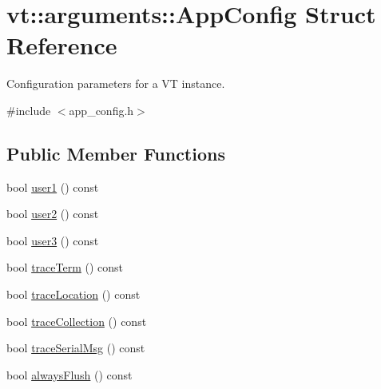 \hypertarget{structvt_1_1arguments_1_1_app_config}{}\section{vt\+:\+:arguments\+:\+:App\+Config Struct Reference}
\label{structvt_1_1arguments_1_1_app_config}


Configuration parameters for a VT instance.  




{\ttfamily \#include $<$app\+\_\+config.\+h$>$}

\subsection*{Public Member Functions}
\begin{DoxyCompactItemize}
\item 
bool \hyperlink{structvt_1_1arguments_1_1_app_config_a2f94b5667c784de4398cb27110555e86}{user1} () const
\item 
bool \hyperlink{structvt_1_1arguments_1_1_app_config_ab504a2952d75b3f1fa9d81e8122cbc41}{user2} () const
\item 
bool \hyperlink{structvt_1_1arguments_1_1_app_config_ad11c798fedeafd2d5ec3f6737226afad}{user3} () const
\item 
bool \hyperlink{structvt_1_1arguments_1_1_app_config_afbe5bc2d7e470809bc204a30158ba96e}{trace\+Term} () const
\item 
bool \hyperlink{structvt_1_1arguments_1_1_app_config_a3a3b55a1c4f5a6b001e346d8b5ce084a}{trace\+Location} () const
\item 
bool \hyperlink{structvt_1_1arguments_1_1_app_config_adddc5276b065e2ea1c7a9b0626a8ce0d}{trace\+Collection} () const
\item 
bool \hyperlink{structvt_1_1arguments_1_1_app_config_a81f20c5bbc19af108fd9487e2a98b003}{trace\+Serial\+Msg} () const
\item 
bool \hyperlink{structvt_1_1arguments_1_1_app_config_adea8d58f81c4df7df475ac9f7780decc}{always\+Flush} () const
\end{DoxyCompactItemize}
